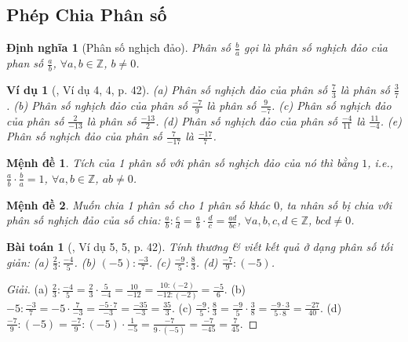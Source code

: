 \documentclass{article}
\newtheorem{baitoan}{Bài toán}
\newtheorem{dinhnghia}{Định nghĩa}
\newtheorem{menhde}{Mệnh đề}
\newtheorem{vidu}{Ví dụ}
\begin{document}
\subsection{Phép Chia Phân số}

\begin{dinhnghia}[Phân số nghịch đảo]
	Phân số $\frac{b}{a}$ gọi là \emph{phân số nghịch đảo} của phan số $\frac{a}{b}$, $\forall a,b\in\mathbb{Z}$, $b\ne0$.
\end{dinhnghia}

\begin{vidu}[\cite{SGK_Toan_6_Canh_Dieu_tap_2}, Ví dụ 4, 4, p. 42]
	(a) Phân số nghịch đảo của phân số $\frac{7}{3}$ là phân số $\frac{3}{7}$. (b) Phân số nghịch đảo của phân số $\frac{-7}{9}$ là phân số $\frac{9}{-7}$. (c) Phân số nghịch đảo của phân số $\frac{2}{-13}$ là phân số $\frac{-13}{2}$. (d) Phân số nghịch đảo của phân số $\frac{-4}{11}$ là $\frac{11}{-4}$. (e) Phân số nghịch đảo của phân số $\frac{7}{-17}$ là $\frac{-17}{7}$.
\end{vidu}

\begin{menhde}
	Tích của 1 phân số với phân số nghịch đảo của nó thì bằng $1$, i.e., $\frac{a}{b}\cdot\frac{b}{a} = 1$, $\forall a,b\in\mathbb{Z}$, $ab\ne0$.
\end{menhde}

\begin{menhde}
	Muốn chia 1 phân số cho 1 phân số khác $0$, ta nhân số bị chia với phân số nghịch đảo của số chia: $\frac{a}{b}:\frac{c}{d} = \frac{a}{b}\cdot\frac{d}{c} = \frac{ad}{bc}$, $\forall a,b,c,d\in\mathbb{Z}$, $bcd\ne0$.
\end{menhde}

\begin{baitoan}[\cite{SGK_Toan_6_Canh_Dieu_tap_2}, Ví dụ 5, 5, p. 42]
	Tính thương \& viết kết quả ở dạng phân số tối giản: (a) $\frac{2}{3}:\frac{-4}{5}$. (b) $(-5):\frac{-3}{7}$. (c) $\frac{-9}{5}:\frac{8}{3}$. (d) $\frac{-7}{9}:(-5)$.
\end{baitoan}

\begin{proof}[Giải]
	(a) $\frac{2}{3}:\frac{-4}{5} = \frac{2}{3}\cdot\frac{5}{-4} = \frac{10}{-12} = \frac{10:(-2)}{-12:(-2)} = \frac{-5}{6}$. (b) $-5:\frac{-3}{7} =  -5\cdot\frac{7}{-3} = \frac{-5\cdot7}{-3} = \frac{-35}{-3} = \frac{35}{3}$. (c) $\frac{-9}{5}:\frac{8}{3} = \frac{-9}{5}\cdot\frac{3}{8} = \frac{-9\cdot3}{5\cdot8} = \frac{-27}{40}$. (d) $\frac{-7}{9}:(-5) = \frac{-7}{9}:(-5)\cdot\frac{1}{-5} = \frac{-7}{9\cdot(-5)} = \frac{-7}{-45} = \frac{7}{45}$.
\end{proof}
\end{document}
